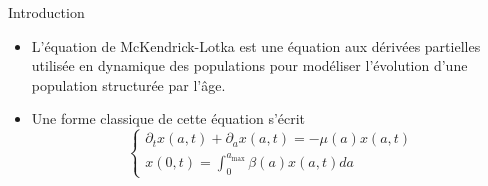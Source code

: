 
\begin{frame}{Introduction}
    \begin{itemize}
        \item L'équation de McKendrick-Lotka est une équation aux dérivées partielles utilisée en dynamique des populations pour modéliser l'évolution d'une population structurée par l'âge. \pause
        \item Une forme classique de cette équation s'écrit
        \begin{equation*}
            \left\{\begin{array}{l}
            \partial_t x(a,t)+\partial_a x(a,t)=-\mu(a)x(a,t) \\
            x(0,t) = \displaystyle{\int_0^{a_{\max}}}\beta(a)x(a,t)da
            \end{array}\right.
        \end{equation*}
    \end{itemize}
\end{frame}